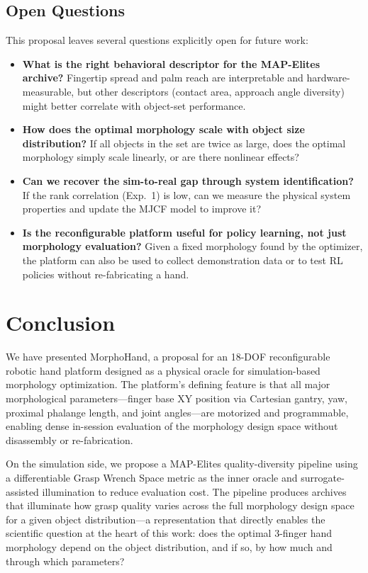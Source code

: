 \documentclass[journal]{IEEEtran}
\begin{document}
\subsection{Open Questions}

This proposal leaves several questions explicitly open for future work:
\begin{itemize}
  \item \textbf{What is the right behavioral descriptor for the MAP-Elites archive?}
    Fingertip spread and palm reach are interpretable and hardware-measurable, but other
    descriptors (contact area, approach angle diversity) might better correlate with
    object-set performance.
  \item \textbf{How does the optimal morphology scale with object size distribution?}
    If all objects in the set are twice as large, does the optimal morphology simply
    scale linearly, or are there nonlinear effects?
  \item \textbf{Can we recover the sim-to-real gap through system identification?}
    If the rank correlation (Exp.\ 1) is low, can we measure the physical system
    properties and update the MJCF model to improve it?
  \item \textbf{Is the reconfigurable platform useful for policy learning, not just
    morphology evaluation?}
    Given a fixed morphology found by the optimizer, the platform can also be used to
    collect demonstration data or to test RL policies without re-fabricating a hand.
\end{itemize}

\section{Conclusion}
\label{sec:conclusion}

We have presented MorphoHand, a proposal for an 18-DOF reconfigurable robotic hand
platform designed as a physical oracle for simulation-based morphology optimization.
The platform's defining feature is that all major morphological parameters---finger
base XY position via Cartesian gantry, yaw, proximal phalange length, and joint angles---are
motorized and programmable, enabling dense in-session evaluation of the morphology
design space without disassembly or re-fabrication.

On the simulation side, we propose a MAP-Elites quality-diversity pipeline using a
differentiable Grasp Wrench Space metric as the inner oracle and surrogate-assisted
illumination to reduce evaluation cost.
The pipeline produces archives that illuminate how grasp quality varies across the full
morphology design space for a given object distribution---a representation that directly
enables the scientific question at the heart of this work: does the optimal 3-finger
hand morphology depend on the object distribution, and if so, by how much and through
which parameters?
\end{document}
